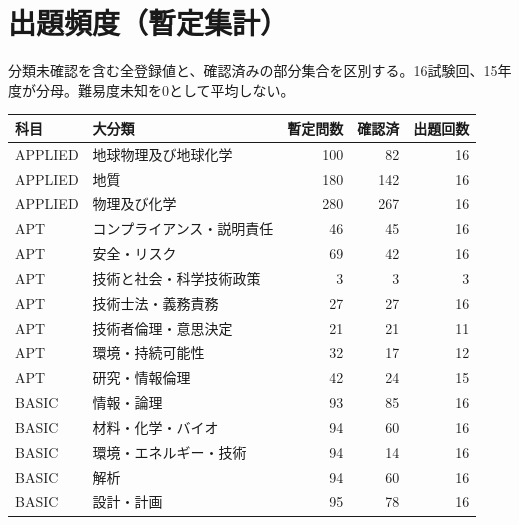 \chapter{出題頻度（暫定集計）}
分類未確認を含む全登録値と、確認済みの部分集合を区別する。16試験回、15年度が分母。難易度未知を0として平均しない。
\begin{longtable}{p{.16\linewidth}p{.42\linewidth}rrr}
科目 & 大分類 & 暫定問数 & 確認済 & 出題回数\\\hline
APPLIED & 地球物理及び地球化学 & 100 & 82 & 16\\
APPLIED & 地質 & 180 & 142 & 16\\
APPLIED & 物理及び化学 & 280 & 267 & 16\\
APT & コンプライアンス・説明責任 & 46 & 45 & 16\\
APT & 安全・リスク & 69 & 42 & 16\\
APT & 技術と社会・科学技術政策 & 3 & 3 & 3\\
APT & 技術士法・義務責務 & 27 & 27 & 16\\
APT & 技術者倫理・意思決定 & 21 & 21 & 11\\
APT & 環境・持続可能性 & 32 & 17 & 12\\
APT & 研究・情報倫理 & 42 & 24 & 15\\
BASIC & 情報・論理 & 93 & 85 & 16\\
BASIC & 材料・化学・バイオ & 94 & 60 & 16\\
BASIC & 環境・エネルギー・技術 & 94 & 14 & 16\\
BASIC & 解析 & 94 & 60 & 16\\
BASIC & 設計・計画 & 95 & 78 & 16\\
\end{longtable}
